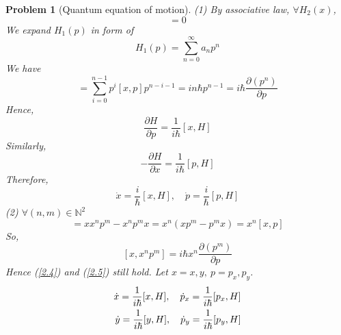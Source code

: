 \documentclass{article}
\theoremstyle{t}
\newtheorem{problem}{Problem}
\newcommand{\pa}{\partial}
\begin{document}
\begin{problem}[Quantum equation of motion]
    (1) By associative law, $\forall H_2(x)$,
    \begin{equation}
        [x,H_2(x)]=0
    \end{equation}
    We expand $H_1(p)$ in form of 
    \begin{equation}
        H_1(p)=\sum_{n=0}^{\infty}a_np^n
    \end{equation}
    We have 
    \begin{equation}
        [x,p^n]=\sum_{i=0}^{n-1}p^i[x,p]p^{n-i-1}=in\hbar p^{n-1}=i\hbar\frac{\pa (p^n)}{\pa p}
    \end{equation}
    Hence,
    \begin{equation}\label{2.4}
        \boxed{\frac{\pa H}{\pa p}=\frac{1}{i\hbar}[x,H]}
    \end{equation}
    Similarly,
    \begin{equation}\label{2.5}
        \boxed{-\frac{\pa H}{\pa x}=\frac{1}{i\hbar}[p,H]}
    \end{equation}
    Therefore,
    \begin{equation}
        \dot{x} = \frac{i}{\hbar} [x, H], \quad \dot{p} = \frac{i}{\hbar} [p, H]
    \end{equation}
    (2) $\forall (n,m)\in \mathbb{N}^2$
    \begin{equation}
        [x,x^np^m]=xx^np^m-x^np^mx=x^n(xp^m-p^mx)=x^n[x,p]
    \end{equation}
    So,
    \begin{equation}
       \boxed{ [x,x^np^m]=i\hbar x^n\frac{\pa(p^m)}{\pa p}}
    \end{equation}
    Hence (\ref{2.4}) and (\ref{2.5}) still hold. Let $x=x,y,\  p=p_x,p_y$.
    \begin{eqnarray}
        \dot{x} = \frac{1}{i\hbar}[x, H], \quad \dot{p}_x = \frac{1}{i\hbar}[p_x, H]\notag\\
        \dot{y} = \frac{1}{i\hbar}[y, H], \quad \dot{p}_y = \frac{1}{i\hbar}[p_y, H]
    \end{eqnarray}
\end{problem}
\newpage
\end{document}
